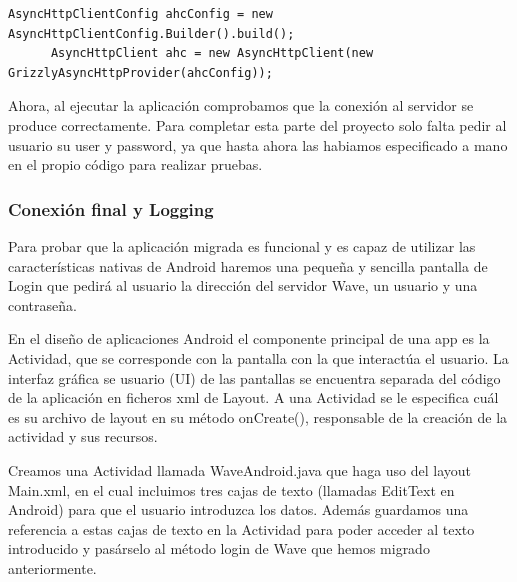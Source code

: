 	  \begin{lstlisting}[frame=single]	
	  AsyncHttpClientConfig ahcConfig = new AsyncHttpClientConfig.Builder().build();
      AsyncHttpClient ahc = new AsyncHttpClient(new GrizzlyAsyncHttpProvider(ahcConfig));
      \end{lstlisting}
      
      Ahora, al ejecutar la aplicación comprobamos que la conexión al servidor se produce correctamente. Para completar esta parte del proyecto solo falta pedir al usuario su user y password, ya que hasta ahora las habiamos especificado a mano en el propio código para realizar pruebas.
	    
    		\subsubsection{Conexión final y Logging}
    
    Para probar que la aplicación migrada es funcional y es capaz de utilizar las características nativas de Android haremos una pequeña y sencilla pantalla de Login que pedirá al usuario la dirección del servidor Wave, un usuario y una contraseña.
    
    En el diseño de aplicaciones Android el componente principal de una app es la Actividad, que se corresponde con la pantalla con la que interactúa el usuario. La interfaz gráfica se usuario (UI) de las pantallas se encuentra separada del código de la aplicación en ficheros xml de Layout\cite{ref:android_layout}. A una Actividad se le especifica cuál es su archivo de layout en su método onCreate(), responsable de la creación de la actividad y sus recursos. 
    
    Creamos una Actividad llamada WaveAndroid.java que haga uso del layout Main.xml, en el cual incluimos tres cajas de texto (llamadas EditText en Android) para que el usuario introduzca los datos. Además guardamos una referencia a estas cajas de texto en la Actividad para poder acceder al texto introducido y pasárselo al método login de Wave que hemos migrado anteriormente.
    

